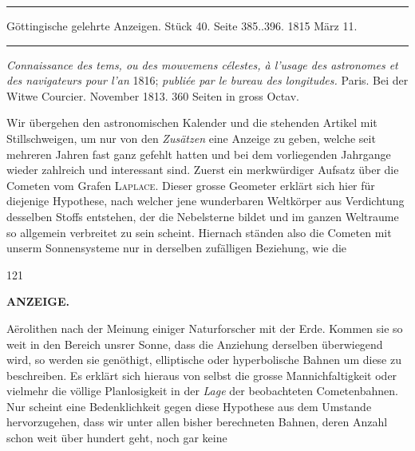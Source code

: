 \par\bigskip

\hypertarget{native-586-lower}{}
\begin{center}\parbox{.92\linewidth}{\centering\small
\rule{\linewidth}{.3pt}\par\smallskip
Göttingische gelehrte Anzeigen. Stück 40. Seite 385..396. 1815 März 11.\par\smallskip
\rule{\linewidth}{.3pt}}\end{center}

\emph{Connaissance des tems, ou des mouvemens célestes, à l'usage des astronomes et des navigateurs pour
l'an} 1816; \emph{ publiée par le bureau des longitudes.} Paris. Bei der Witwe Courcier. November 1813. 360 Seiten
in gross Octav.

Wir übergehen den astronomischen Kalender und die stehenden Artikel mit Stillschweigen, um nur von den
\emph{Zusätzen} eine Anzeige zu geben, welche seit mehreren Jahren fast ganz gefehlt hatten und bei dem
vorliegenden Jahrgange wieder zahlreich und interessant sind. Zuerst ein merkwürdiger Aufsatz über die
Cometen vom Grafen \textsc{Laplace}. Dieser grosse Geometer erklärt sich hier für diejenige Hypothese,
nach welcher jene wunderbaren Weltkörper aus Verdichtung desselben Stoffs entstehen, der die Nebelsterne
bildet und im ganzen Weltraume so allgemein verbreitet zu sein scheint. Hiernach ständen also die Cometen
mit unserm Sonnensysteme nur in derselben zufälligen Beziehung, wie die
\par
\vfill{}\hfill{\small 121}\hspace*{.18\linewidth}\par
\clearpage
\thispagestyle{empty}
\noindent{}%
%
\parbox[t]{\dimexpr\linewidth-24mm\relax}{\centering\footnotesize\bfseries ANZEIGE.}%
\makebox[12mm][r]{}\par\nobreak\medskip
\noindent Aërolithen nach der Meinung einiger Naturforscher mit der Erde. Kommen sie so weit in den Bereich unsrer
Sonne, dass die Anziehung derselben überwiegend wird, so werden sie genöthigt, elliptische oder
hyperbolische Bahnen um diese zu beschreiben. Es erklärt sich hieraus von selbst die grosse
Mannichfaltigkeit oder vielmehr die völlige Planlosigkeit in der \emph{Lage} der beobachteten
Cometenbahnen. Nur scheint eine Bedenklichkeit gegen diese Hypothese aus dem Umstande hervorzugehen, dass
wir unter allen bisher berechneten Bahnen, deren Anzahl schon weit über hundert geht, noch gar keine
